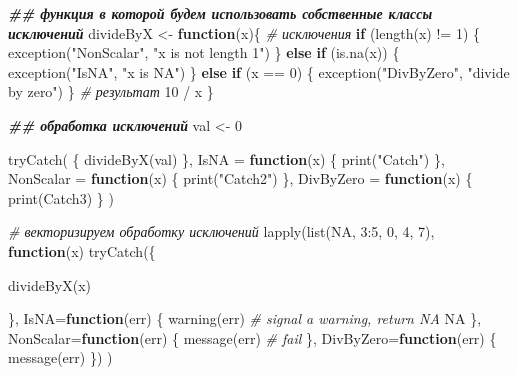 \documentclass[
]{book}
\newenvironment{Shaded}{\begin{snugshade}}{\end{snugshade}}
\newcommand{\AttributeTok}[1]{\textcolor[rgb]{0.77,0.63,0.00}{#1}}
\newcommand{\CommentTok}[1]{\textcolor[rgb]{0.56,0.35,0.01}{\textit{#1}}}
\newcommand{\ConstantTok}[1]{\textcolor[rgb]{0.00,0.00,0.00}{#1}}
\newcommand{\ControlFlowTok}[1]{\textcolor[rgb]{0.13,0.29,0.53}{\textbf{#1}}}
\newcommand{\DecValTok}[1]{\textcolor[rgb]{0.00,0.00,0.81}{#1}}
\newcommand{\DocumentationTok}[1]{\textcolor[rgb]{0.56,0.35,0.01}{\textbf{\textit{#1}}}}
\newcommand{\FunctionTok}[1]{\textcolor[rgb]{0.00,0.00,0.00}{#1}}
\newcommand{\NormalTok}[1]{#1}
\newcommand{\OtherTok}[1]{\textcolor[rgb]{0.56,0.35,0.01}{#1}}
\newcommand{\SpecialCharTok}[1]{\textcolor[rgb]{0.00,0.00,0.00}{#1}}
\newcommand{\StringTok}[1]{\textcolor[rgb]{0.31,0.60,0.02}{#1}}
\begin{document}
\begin{Shaded}
\begin{Highlighting}[]
\DocumentationTok{\#\# функция в которой будем использовать собственные классы исключений}
\NormalTok{divideByX }\OtherTok{\textless{}{-}} \ControlFlowTok{function}\NormalTok{(x)\{}
  \CommentTok{\# исключения}
  \ControlFlowTok{if}\NormalTok{ (}\FunctionTok{length}\NormalTok{(x) }\SpecialCharTok{!=} \DecValTok{1}\NormalTok{) \{}
    \FunctionTok{exception}\NormalTok{(}\StringTok{"NonScalar"}\NormalTok{, }\StringTok{"x is not length 1"}\NormalTok{)}
\NormalTok{  \} }\ControlFlowTok{else} \ControlFlowTok{if}\NormalTok{ (}\FunctionTok{is.na}\NormalTok{(x)) \{}
    \FunctionTok{exception}\NormalTok{(}\StringTok{"IsNA"}\NormalTok{, }\StringTok{"x is NA"}\NormalTok{)}
\NormalTok{  \} }\ControlFlowTok{else} \ControlFlowTok{if}\NormalTok{ (x }\SpecialCharTok{==} \DecValTok{0}\NormalTok{) \{}
    \FunctionTok{exception}\NormalTok{(}\StringTok{"DivByZero"}\NormalTok{, }\StringTok{"divide by zero"}\NormalTok{)}
\NormalTok{  \}}
  \CommentTok{\# результат}
  \DecValTok{10} \SpecialCharTok{/}\NormalTok{ x}
\NormalTok{\}}

\DocumentationTok{\#\# обработка исключений}
\NormalTok{val }\OtherTok{\textless{}{-}} \DecValTok{0}

\FunctionTok{tryCatch}\NormalTok{(}
\NormalTok{  \{}
    \FunctionTok{divideByX}\NormalTok{(val)}
\NormalTok{  \}, }
  \AttributeTok{IsNA =} \ControlFlowTok{function}\NormalTok{(x) \{}
    \FunctionTok{print}\NormalTok{(}\StringTok{"Catch"}\NormalTok{)}
\NormalTok{  \},}
  \AttributeTok{NonScalar =} \ControlFlowTok{function}\NormalTok{(x) \{}
    \FunctionTok{print}\NormalTok{(}\StringTok{"Catch2"}\NormalTok{)}
\NormalTok{  \},}
  \AttributeTok{DivByZero =} \ControlFlowTok{function}\NormalTok{(x) \{}
    \FunctionTok{print}\NormalTok{(}\StringTok{\textquotesingle{}Catch3\textquotesingle{}}\NormalTok{)}
\NormalTok{  \}}
\NormalTok{)}

\CommentTok{\# векторизируем обработку исключений}
\FunctionTok{lapply}\NormalTok{(}\FunctionTok{list}\NormalTok{(}\ConstantTok{NA}\NormalTok{, }\DecValTok{3}\SpecialCharTok{:}\DecValTok{5}\NormalTok{, }\DecValTok{0}\NormalTok{, }\DecValTok{4}\NormalTok{, }\DecValTok{7}\NormalTok{), }
       \ControlFlowTok{function}\NormalTok{(x) }\FunctionTok{tryCatch}\NormalTok{(\{}
         
           \FunctionTok{divideByX}\NormalTok{(x)}
         
\NormalTok{       \}, }
       \AttributeTok{IsNA=}\ControlFlowTok{function}\NormalTok{(err) \{}
            \FunctionTok{warning}\NormalTok{(err)  }\CommentTok{\# signal a warning, return NA}
            \ConstantTok{NA}
\NormalTok{       \}, }
       \AttributeTok{NonScalar=}\ControlFlowTok{function}\NormalTok{(err) \{}
            \FunctionTok{message}\NormalTok{(err)     }\CommentTok{\# fail}
\NormalTok{       \},}
       \AttributeTok{DivByZero=}\ControlFlowTok{function}\NormalTok{(err) \{}
            \FunctionTok{message}\NormalTok{(err)}
\NormalTok{       \})}
\NormalTok{)}
\end{Highlighting}
\end{Shaded}
\end{document}
